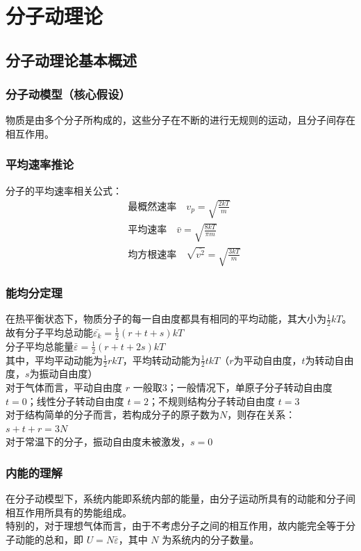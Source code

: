 \documentclass{article}
\begin{document}
	
	
	
	\section{分子动理论}

	
	\subsection{分子动理论基本概述}
	
	\subsubsection{分子动模型（核心假设）}
	物质是由多个分子所构成的，这些分子在不断的进行无规则的运动，且分子间存在相互作用。
	
	\subsubsection{平均速率推论}
	分子的平均速率相关公式：
	\begin{align*}
		&\text{最概然速率} \quad v_p=\sqrt{\frac{2kT}{m}}\\
		&\text{平均速率} \quad \bar{v}=\sqrt{\frac{8kT}{\pi m}}\\
		&\text{均方根速率} \quad \sqrt{\overline{v^2}}=\sqrt{\frac{3kT}{m}}
	\end{align*}
	
	\subsubsection{能均分定理}
	在热平衡状态下，物质分子的每一自由度都具有相同的平均动能，其大小为$\frac{1}{2}kT$。故有分子平均总动能$\bar{\varepsilon_k} = \frac{1}{2}(r + t + s)kT$
	\\分子平均总能量$\bar{\varepsilon} = \frac{1}{2}(r + t + 2s)kT$
	\\其中，平均平动动能为$\frac{1}{2}rkT$，平均转动动能为$\frac{1}{2}tkT$（$r$为平动自由度，$t$为转动自由度，$s$为振动自由度）
	\\对于气体而言，平动自由度 $r$ 一般取$3$；一般情况下，单原子分子转动自由度 $t = 0$；线性分子转动自由度 $t = 2$；不规则结构分子转动自由度 $t = 3$
	\\对于结构简单的分子而言，若构成分子的原子数为$N$，则存在关系：$s + t + r = 3N$
	\\对于常温下的分子，振动自由度未被激发，$s = 0$
	
	\subsubsection{内能的理解}
	在分子动模型下，系统内能即系统内部的能量，由分子运动所具有的动能和分子间相互作用所具有的势能组成。
	\\特别的，对于理想气体而言，由于不考虑分子之间的相互作用，故内能完全等于分子动能的总和，即 $U = N\bar{\varepsilon}$，其中 $N$ 为系统内的分子数量。
	
\end{document}
